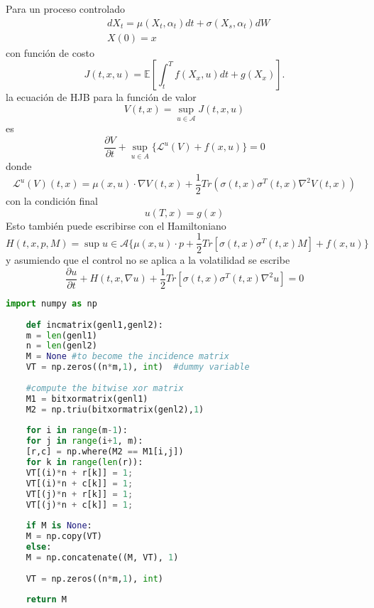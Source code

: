 \documentclass{article}
\newcommand{\dpartial}[2]{\frac{\partial #1}{\partial #2}}
\newenvironment{recordar}[1][Recordar]
{\begin{tcolorbox}[breakable,colback=red!10!white,colframe=red!50!blue,title=Recordar: #1 ,enhanced jigsaw]
	
}{\end{tcolorbox}}
\begin{document}
\begin{recordar}[Hamilton-Jacobi-Bellman]
	Para un proceso controlado
	\begin{equation*}
		\begin{split}
			&dX_t=\mu(X_t,\alpha_t)dt+\sigma(X_s,\alpha_t)dW\\
			&X(0)=x
		\end{split}
	\end{equation*}
con función de costo
\begin{equation*}
	J(t,x,u)=\mathbb{E}\left[\int_{t}^{T}f(X_x,u) dt +g(X_x)\right].
\end{equation*}
la ecuación de HJB para la función de valor
\begin{equation*}
	V(t,x)=\sup_{u\in \mathcal{A}}J(t,x,u)
\end{equation*}
es
\begin{equation*}
	\dpartial{V}{t}+\sup_{u\in A}\{ \mathcal{L}^{u}(V)+f(x,u)\}=0
\end{equation*}
donde 
\begin{equation*}
	\mathcal{L}^{u}(V)(t,x)=\mu(x,u)\cdot \nabla V(t,x) +\frac{1}{2}Tr(\sigma(t,x)\sigma^{T}(t,x)\nabla^2 V(t,x))
\end{equation*}
con la condición final
\begin{equation*}
	u(T,x)=g(x)
\end{equation*}
Esto también puede escribirse con el Hamiltoniano
	\begin{equation*}
		H(t,x,p,M)=\sup{u\in \mathcal{A}}\{\mu(x,u)\cdot p+\frac{1}{2}Tr[\sigma(t,x)\sigma^{T}(t,x)M]+f(x,u)\}
	\end{equation*}
y asumiendo que el control no se aplica a la volatilidad se escribe
\begin{equation*}
	\dpartial{u}{t}+H(t,x,\nabla u)+\frac{1}{2}Tr[\sigma(t,x)\sigma^{T}(t,x)\nabla^2 u]=0
\end{equation*}

\end{recordar}


\begin{lstlisting}[language=Python]
	import numpy as np
	
	def incmatrix(genl1,genl2):
	m = len(genl1)
	n = len(genl2)
	M = None #to become the incidence matrix
	VT = np.zeros((n*m,1), int)  #dummy variable
	
	#compute the bitwise xor matrix
	M1 = bitxormatrix(genl1)
	M2 = np.triu(bitxormatrix(genl2),1) 
	
	for i in range(m-1):
	for j in range(i+1, m):
	[r,c] = np.where(M2 == M1[i,j])
	for k in range(len(r)):
	VT[(i)*n + r[k]] = 1;
	VT[(i)*n + c[k]] = 1;
	VT[(j)*n + r[k]] = 1;
	VT[(j)*n + c[k]] = 1;
	
	if M is None:
	M = np.copy(VT)
	else:
	M = np.concatenate((M, VT), 1)
	
	VT = np.zeros((n*m,1), int)
	
	return M
\end{lstlisting}
\end{document}
